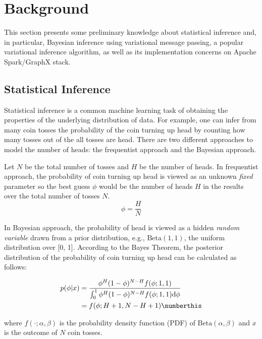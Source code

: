 \section{Background}
\label{sec:background}
This section presents some preliminary knowledge about
statistical inference and, in particular, Bayesian inference using 
variational message passing, a popular variational inference algorithm, 
as well as its implementation concerns on Apache Spark/GraphX stack.
  
\subsection{Statistical Inference}

Statistical inference is a common machine learning task of obtaining the
properties of the underlying distribution of data. For example, one can infer
from many coin tosses the probability of the coin turning up head by counting
how many tosses out of the all tosses are head. There are two different
approaches to model the number of heads: the frequentist approach and the
Bayesian approach.


Let $N$ be the total number of tosses and $H$ be the number of heads.  In
frequentist approach, the probability of coin turning up head is viewed as an
unknown \emph{fixed} parameter so the best guess $\phi$ would be the number of heads $H$ in the
results over the total number of tosses $N$.
\begin{equation*}
	\phi = \frac{H}{N}
\end{equation*}

In Bayesian approach, the probability of head is viewed as a hidden \emph{random
variable} drawn from a prior distribution, e.g., $\mathrm{Beta}(1, 1)$, the
uniform distribution over [0, 1]. According to the Bayes Theorem, the
posterior distribution of the probability of coin turning up head can be
calculated as follows:

\begin{align*}
	p(\phi|x) &= \frac{ \phi^H (1-\phi)^{N-H} f(\phi; 1, 1)}{\int_0^1 \phi^H
	(1-\phi)^{N-H} f(\phi; 1, 1)\mathrm{d}\phi} \\ &= f(\phi; H+1, N-H+1) \numberthis
	\label{eqn:coin_posterior}
\end{align*}

\noindent
where $f(\cdot; \alpha, \beta)$ is the probability density function (PDF) of
$\mathrm{Beta}(\alpha, \beta)$ and $x$ is the outcome of $N$ coin tosses.

